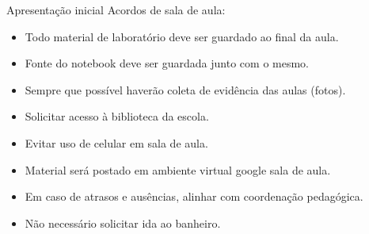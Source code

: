 
\begin{frame}{Apresentação inicial}
    Acordos de sala de aula:
    \begin{itemize}
        \item Todo material de laboratório deve ser guardado ao final da aula.
        \item Fonte do notebook deve ser guardada junto com o mesmo.
        \item Sempre que possível haverão coleta de evidência das aulas (fotos).
        \item Solicitar acesso à biblioteca da escola.
        \item Evitar uso de celular em sala de aula.
        \item Material será postado em ambiente virtual google sala de aula.
        \item Em caso de atrasos e ausências, alinhar com coordenação pedagógica.
        \item Não necessário solicitar ida ao banheiro.
    \end{itemize}
\end{frame}

